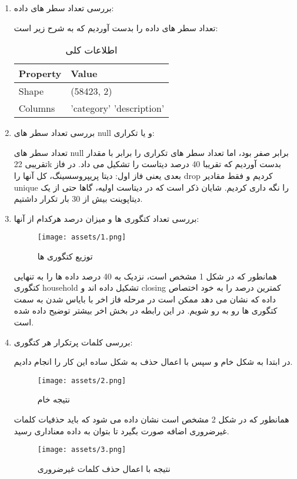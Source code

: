 \documentclass[a4paper,12pt]{article}
\begin{document}
	\begin{enumerate}
		\item 
		بررسی تعداد سطر های داده:
		
		تعداد سطر های داده را بدست آوردیم که به شرح زیر است:
		\begin{table}[h]
			\centering
			\begin{tabular}{|l|l|}
				\hline
				\textbf{Property} & \textbf{Value} \\
				\hline
				Shape & (58423, 2) \\
				\hline
				Columns & 'category' 'description' \\
				\hline
			\end{tabular}
			\caption{اطلاعات کلی}
		\end{table}
		
		\item 
		بررسی تعداد سطر های null و یا تکراری:
		
		تعداد سطر های null برابر صفر بود، اما تعداد سطر های تکراری را برابر با مقدار تقریبی 22k بدست آوردیم که تقریبا 40 درصد دیتاست را تشکیل می داد. در فاز بعدی یعنی فاز اول: دیتا پریپروسسینگ، کل آنها را drop کردیم و فقط مقادیر unique را نگه داری کردیم. شایان ذکر است که در دیتاست اولیه، گاها حتی از یک دیتاپوینت بیش از 30 بار تکرار داشتیم.
		
		\item 
		بررسی تعداد کتگوری ها و میزان درصد هرکدام از آنها:
		\begin{figure}[h]
			\centering
			\texttt{[image: assets/1.png]}
			\caption{\textcolor{CustomAccent}{توزیع کتگوری ها}}
		\end{figure}
		همانطور که در شکل 1 مشخص است، نزدیک به 40 درصد داده ها را به تنهایی کتگوری household تشکیل داده اند و closing کمترین درصد را به خود اختصاص داده که نشان می دهد ممکن است در مرحله فاز اخر با بایاس شدن به سمت کتگوری ها رو به رو شویم. در این رابطه در بخش اخر بیشتر توضیح داده شده است.
		
		\item 
		بررسی کلمات پرتکرار هر کتگوری:
		
		در ابتدا به شکل خام و سپس با اعمال حذف به شکل ساده این کار را انجام دادیم.
		\begin{figure}[H]
			\centering
			\texttt{[image: assets/2.png]}
			\caption{\textcolor{CustomAccent}{نتیجه خام}}
		\end{figure}
		همانطور که در شکل 2 مشخص است نشان داده می شود که باید حذفیات کلمات غیرضروری اضافه صورت بگیرد تا بتوان  به داده معناداری رسید.
		
		\begin{figure}[H]
			\centering
			\texttt{[image: assets/3.png]}
			\caption{\textcolor{CustomAccent}{نتیجه با اعمال حذف کلمات غیرضروری}}
		\end{figure}
		

\end{enumerate}
\end{document}
